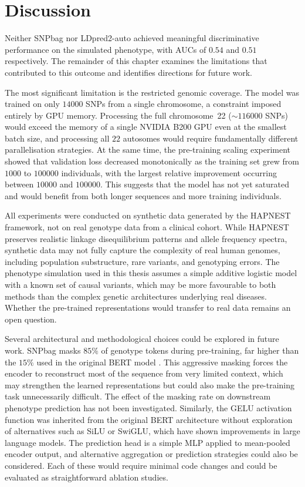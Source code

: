 \chapter{Discussion}
\label{ch:discussion}

Neither SNPbag nor LDpred2-auto achieved meaningful discriminative
performance on the simulated phenotype, with AUCs of $0.54$ and $0.51$
respectively. The remainder of this chapter examines the limitations that
contributed to this outcome and identifies directions for future work.

The most significant limitation is the restricted genomic coverage.
The model was trained on only $14000$ SNPs from a single chromosome,
a constraint imposed entirely by GPU memory. Processing the full
chromosome~22 ($\sim\!116000$ SNPs) would exceed the memory of a
single NVIDIA B200 GPU even at the smallest batch size, and processing
all $22$ autosomes would require fundamentally different parallelisation
strategies. At the same time, the pre-training scaling experiment showed
that validation loss decreased monotonically as the training set grew
from $1000$ to $100000$ individuals, with the largest relative
improvement occurring between $10000$ and $100000$. This suggests
that the model has not yet saturated and would benefit from both longer
sequences and more training individuals.

All experiments were conducted on synthetic data generated by the HAPNEST
framework, not on real genotype data from a clinical cohort. While HAPNEST
preserves realistic linkage disequilibrium patterns and allele frequency
spectra, synthetic data may not fully capture the complexity of real human
genomes, including population substructure, rare variants, and genotyping
errors. The phenotype simulation used in this thesis assumes a simple
additive logistic model with a known set of causal variants, which may be
more favourable to both methods than the complex genetic architectures
underlying real diseases. Whether the pre-trained representations would
transfer to real data remains an open question.

Several architectural and methodological choices could be explored in
future work. SNPbag masks $85\%$ of genotype tokens during pre-training,
far higher than the $15\%$ used in the original BERT model
\citep{Devlin2019}. This aggressive masking forces the encoder to
reconstruct most of the sequence from very limited context, which may
strengthen the learned representations but could also make the
pre-training task unnecessarily difficult. The effect of the masking rate
on downstream phenotype prediction has not been investigated. Similarly,
the GELU activation function was inherited from the original BERT
architecture without exploration of alternatives such as SiLU or SwiGLU,
which have shown improvements in large language models. The prediction
head is a simple MLP applied to mean-pooled encoder output, and
alternative aggregation or prediction strategies could also be
considered. Each of these would require minimal code changes and could be
evaluated as straightforward ablation studies.

